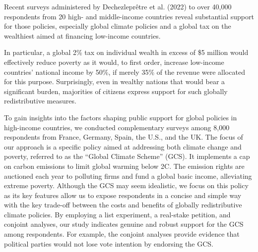 \documentclass{nature}
\begin{document}
Recent surveys administered by Dechezleprêtre et al. (2022)\cite{dechezlepretre_fighting_2022} to over 40,000 respondents from 20 high- and middle-income countries reveal substantial support for those policies, especially global climate policies and a global tax on the wealthiest aimed at financing low-income countries. %
 
In particular, a global 2\% tax on individual wealth in excess of \$5 million would effectively reduce poverty as it would, to first order, increase low-income countries' national income by 50\%, if merely 35\% of the revenue were allocated for this purpose.\cite{chancel_world_2022} %
Surprisingly, even in wealthy nations that would bear a significant burden, majorities of citizens express support for such globally redistributive measures.%

To gain insights into the factors shaping public support for global policies in high-income countries, we conducted complementary surveys among 8,000 respondents from France, Germany, Spain, the U.S., and the UK. The focus of our approach is a specific policy aimed at addressing both climate change and poverty, referred to as the ``Global Climate Scheme'' (GCS). It implements a cap on carbon emissions to limit global warming below 2\textdegree{}C. The emission rights are auctioned each year to polluting firms and fund a global basic income, alleviating extreme poverty. Although the GCS may seem idealistic, we focus on this policy as its key features allow us to expose respondents in a concise and simple way with the key trade-off between the costs and benefits of globally redistributive climate policies. %
By employing a list experiment, a real-stake petition, and conjoint analyses, our study indicates genuine and robust support for the GCS among respondents. For example, the conjoint analyses provide evidence that political parties would not lose vote intention by endorsing the GCS.%
\end{document}
